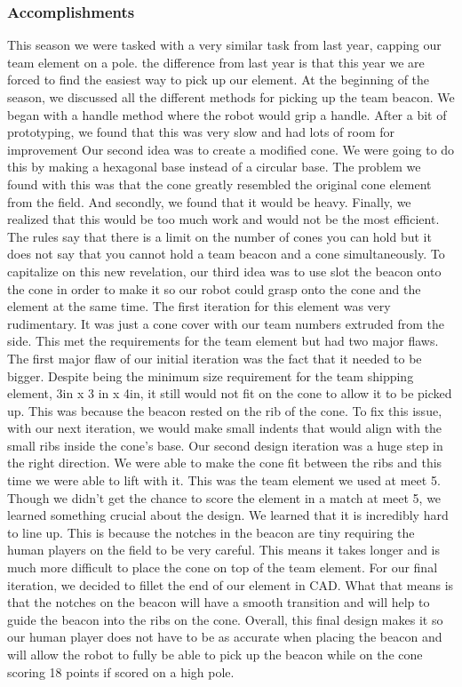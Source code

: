\subsubsection*{Accomplishments}
This season we were tasked with a very similar task from last year, capping our team element on a pole. the difference from last year is that this year we are forced to find the easiest way to pick up our element. 
At the beginning of the season, we discussed all the different methods for picking up the team beacon. We began with a handle method where the robot would grip a handle. After a bit of prototyping, we found that this was very slow and had lots of room for improvement
Our second idea was to create a modified cone. We were going to do this by making a hexagonal base instead of a circular base. The problem we found with this was that the cone greatly resembled the original cone element from the field. And secondly, we found that it would be heavy. Finally, we realized that this would be too much work and would not be the most efficient. The rules say that there is a limit on the number of cones you can hold but it does not say that you cannot hold a team beacon and a cone simultaneously.
To capitalize on this new revelation, our third idea was to use slot the beacon onto the cone in order to make it so our robot could grasp onto the cone and the element at the same time.  The first iteration for this element was very rudimentary. It was just a cone cover with our team numbers extruded from the side. This met the requirements for the team element but had two major flaws.
The first major flaw of our initial iteration was the fact that it needed to be bigger. Despite being the minimum size requirement for the team shipping element, 3in x 3 in x 4in, it still would not fit on the cone to allow it to be picked up. This was because the beacon rested on the rib of the cone. To fix this issue, with our next iteration, we would make small indents that would align with the small ribs inside the cone's base.
Our second design iteration was a huge step in the right direction. We were able to make the cone fit between the ribs and this time we were able to lift with it. This was the team element we used at meet 5. Though we didn't get the chance to score the element in a match at meet 5, we learned something crucial about the design. We learned that it is incredibly hard to line up. This is because the notches in the beacon are tiny requiring the human players on the field to be very careful. This means it takes longer and is much more difficult to place the cone on top of the team element.
For our final iteration, we decided to fillet the end of our element in CAD. What that means is that the notches on the beacon will have a smooth transition and will help to guide the beacon into the ribs on the cone. Overall, this final design makes it so our human player does not have to be as accurate when placing the beacon and will allow the robot to fully be able to pick up the beacon while on the cone scoring 18 points if scored on a high pole.
 

